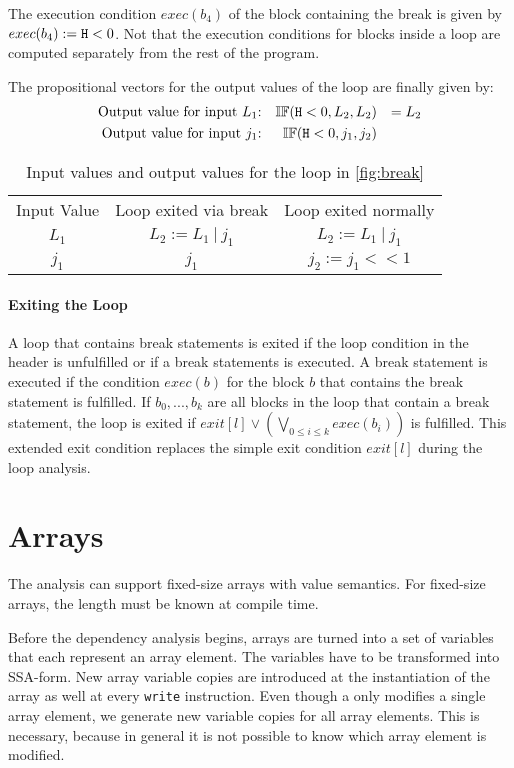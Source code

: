 The execution condition $exec(b_4)$ of the block containing the break is given by $exec(b_4) := \mathtt{H} < 0$. Not that the execution conditions for blocks inside a loop are computed separately from the rest of the program.

The propositional vectors for the output values of the loop are finally given by:
\begin{align*}
    \text{Output value for input $L_1$:} && \mathbb{IF}(\mathtt{H} < 0 , L_2 , L_2) && = L_2 \\
    \text{Output value for input $j_1$:} && \mathbb{IF}(\mathtt{H} < 0 , j_1, j_2)\\
\end{align*}

\begin{table}[]
    \centering
    \begin{tabular}{|c|c|c|}
     Input Value &  Loop exited via break & Loop exited normally \\
        $L_1$ & $L_2 := L_1 \: | \: j_1$ & $L_2 := L_1 \: | \: j_1$ \\
        $j_1$ & $j_1$ & $j_2 := j_1 << 1$
\end{tabular}
    \caption{Input values and output values for the loop in \ref{fig:break}}
    \label{tab:break}
\end{table}

\paragraph{Exiting the Loop}
A loop that contains break statements is exited if the loop condition in the header is unfulfilled or if a break statements is executed. A break statement is executed if the condition $exec(b)$ for the block $b$ that contains the break statement is fulfilled. If $b_0, ..., b_k$ are all blocks in the loop that contain a break statement, the loop is exited if $exit[l] \lor (\bigvee\limits_{0 \leq i \leq k} exec(b_i))$ is fulfilled. This extended exit condition replaces the simple exit condition $exit[l]$ during the loop analysis.

\section{Arrays}
The analysis can support fixed-size arrays with value semantics. For fixed-size arrays, the length must be known at compile time.

Before the dependency analysis begins, arrays are turned into a set of variables that each represent an array element. The variables have to be transformed into SSA-form. New array variable copies are introduced at the instantiation of the array as well at every \texttt{write} instruction. Even though a only modifies a single array element, we generate new variable copies for all array elements. This is necessary, because in general it is not possible to know which array element is modified.

